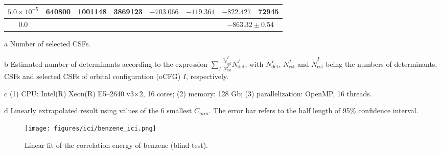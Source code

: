\documentclass[journal=jcp,manuscript=suppinfo]{achemso}
\begin{document}
\begin{table}[!htp]
\begin{threeparttable}
\begin{tabular}{c|rrrrrrr}
			$5.0\times10^{-5}$ &   640800 &  1001148 &3869123&  $-703.066$  &  $-119.361$&  $-822.427$ &72945\\\midrule
			0.0\tnote{b}&&&&&&\multicolumn{2}{c}{$-863.32\pm0.54$}\\\bottomrule
		\end{tabular}
\begin{tablenotes}
\item[a]Number of selected CSFs.
\item[b]Estimated number of determinants according to the expression $\sum_I\frac{\tilde{N}_{\mathrm{csf}}^I}{N_{\mathrm{csf}}^I}N_{\mathrm{det}}^I$, with $N_{\mathrm{det}}^I$, $N_{\mathrm{csf}}^I$ and $\tilde{N}_{\mathrm{csf}}^I$ being the numbers of determinants, CSFs and selected CSFs of orbital configuration (oCFG) $I$, respectively.
\item[c](1) CPU: Intel(R) Xeon(R) E5--2640 v3$\times$2, 16 cores; (2) memory: 128 Gb;
			(3) parallelization: OpenMP, 16 threads.
\item[d]Linearly extrapolated result using values of the 6 smallest $C_{min}$. The error bar refers to the half length of 95\% confidence interval.
		\end{tablenotes}
	\end{threeparttable}
	\label{OldHF}
\end{table}

\begin{figure}[!htp]
	\centering
	\texttt{[image: figures/ici/benzene\_ici.png]}
	\caption{ Linear fit of the correlation energy of benzene (blind test).}\label{BenzeneEn}
\end{figure}
\end{document}
